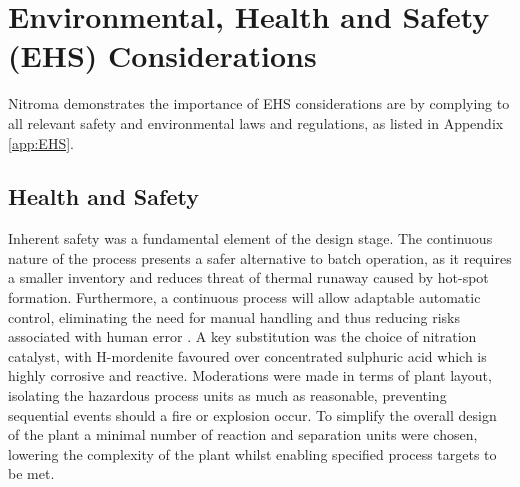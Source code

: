 \section{Environmental, Health and Safety (EHS) Considerations}
\label{sec:ehs}


Nitroma demonstrates the importance of EHS considerations are by complying to all relevant safety and environmental laws and regulations, as listed in Appendix \ref{app:EHS}. 

\subsection{Health and Safety}
Inherent safety was a fundamental element of the design stage. The continuous nature of the process presents a safer alternative to batch operation, as it requires a smaller inventory and reduces threat of thermal runaway caused by hot-spot formation. Furthermore, a continuous process will allow adaptable automatic control, eliminating the need for manual handling and thus reducing risks associated with human error \cite{mannan_lees_2012}. A key substitution was the choice of nitration catalyst, with H-mordenite favoured over concentrated sulphuric acid which is highly corrosive and reactive. Moderations were made in terms of plant layout, isolating the hazardous process units as much as reasonable, preventing sequential events should a fire or explosion occur. To simplify the overall design of the plant a minimal number of reaction and separation units were chosen, lowering the complexity of the plant whilst enabling specified process targets to be met. 


